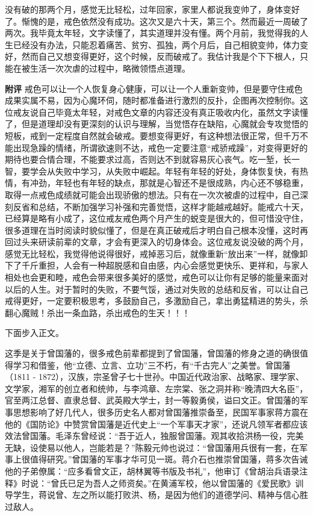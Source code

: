 \begin{case}
    没有破的那两个月，感觉无比轻松，过年回家，家里人都说我变帅了，身体变好了。惭愧的是，戒色依然没有成功。这次又是六十天，第三个。然而最近一周破了两次。我毕竟太年轻，文字读懂了，其实道理并没有懂。两个月前，我觉得我的人生已经没有办法，只能忍着痛苦、贫穷、孤独，两个月后，自己相貌变帅，体力变好，然而自己又想变得更好，这个时候，反而破戒了。我估计我是个下下根人，只能在被生活一次次虐的过程中，略微领悟点道理。

    \textbf{附评} 戒色可以让一个人恢复身心健康，可以让一个人重新变帅，但是要守住戒色成果实属不易，因为心魔环伺，随时都准备进行激烈的反扑，企图再次控制你。这位戒友说自己毕竟太年轻，对戒色文章的内容还没有真正吸收内化，虽然文字读懂了，但是道理却没有更深刻的认识与理解，当觉悟存在缺陷，心魔就会专攻觉悟的短板，戒到一定程度自然就会破戒。要想变得更好，有这种想法很正常，但千万不能出现急躁的情绪，所谓欲速则不达，戒色一定要注意“戒骄戒躁”，对变得更好的期待也要合情合理，不能要求过高，否则达不到就容易灰心丧气。吃一堑，长一智，要学会从失败中学习，从失败中崛起。年轻有年轻的好处，身体恢复快，有热情，有冲劲，年轻也有年轻的缺点，那就是心智还不是很成熟，内心还不够稳重，取得一点戒色成绩就可能会出现骄傲的想法。只有在一次次被虐的过程中，自己深刻反省和总结，不断加强学习补强和完善觉悟，这样才能越戒越好。能戒六十天，已经算是略有小成了，这位戒友戒色两个月产生的蜕变是很大的，但可惜没守住，很多道理在当时阅读时貌似懂了，但是在真正破戒后才明白自己根本没懂，这时再回过头来研读前辈的文章，才会有更深入的切身体会。这位戒友说没破的两个月，感觉无比轻松，我觉得他说得很好，戒掉恶习后，就像重新“放出来”一样，就像卸下了千斤重担，人会有一种超脱感和自由感，内心会感觉更快乐、更祥和，与家人相处也会更和睦，戒色会带来很多美好的感觉，戒色可以让你有足够的能量来面对以后的人生。对于暂时的失败，不要气馁，通过对失败的总结和反省，可以让自己戒得更好，一定要积极思考，多鼓励自己，多激励自己，拿出勇猛精进的势头，杀翻心魔贼！杀出一条血路，杀出戒色的生天！！！
\end{case}

下面步入正文。

这季是关于曾国藩的，很多戒色前辈都提到了曾国藩，曾国藩的修身之道的确很值得学习和借鉴，他“立德、立言、立功”三不朽，有“千古完人”之美誉。曾国藩（1811 - 1872），汉族，宗圣曾子七十世孙。中国近代政治家、战略家、理学家、文学家，湘军的创立者和统帅，与李鸿章、左宗棠、张之洞并称“晚清四大名臣”，官至两江总督、直隶总督、武英殿大学士，封一等毅勇侯，谥曰文正。曾国藩的军事思想影响了好几代人，很多历史名人都对曾国藩推崇备至，民国军事家蒋方震在他的《国防论》中赞赏曾国藩是近代史上“一个军事天才家”，还说凡领军者都应该效法曾国藩。毛泽东曾经说：“吾于近人，独服曾国藩。观其收拾洪杨一役，完美无缺，设使易以他人，岂能若是？”陈毅元帅也说过：“曾国藩用兵很有一套，在军事上很值得研究。”曾国藩的军事才华可见一斑。蒋介石也推崇曾国藩，蒋多次告诫他的子弟僚属：“应多看曾文正，胡林翼等书版及书礼”，他审订《曾胡治兵语录注释》时说：“曾氏已足为吾人之师资矣。”在黄浦军校，他以曾国藩的《爱民歌》训导学生，蒋说曾、左之所以能打败洪、杨，是因为他们的道德学问、精神与信心胜过敌人。

